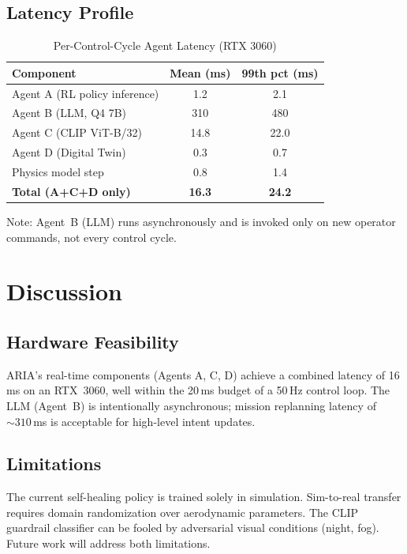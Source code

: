 \documentclass[10pt,twocolumn]{article}
\begin{document}
\subsection{Latency Profile}

\begin{table}[h]
\centering
\caption{Per-Control-Cycle Agent Latency (RTX 3060)}
\label{tab:latency}
\begin{tabular}{lcc}
\toprule
Component & Mean (ms) & 99th pct (ms) \\
\midrule
Agent A (RL policy inference) & 1.2  & 2.1 \\
Agent B (LLM, Q4 7B)          & 310  & 480 \\
Agent C (CLIP ViT-B/32)       & 14.8 & 22.0 \\
Agent D (Digital Twin)        & 0.3  & 0.7 \\
Physics model step            & 0.8  & 1.4 \\
\midrule
\textbf{Total (A+C+D only)}   & \textbf{16.3} & \textbf{24.2} \\
\bottomrule
\end{tabular}
\end{table}

Note: Agent~B (LLM) runs asynchronously and is invoked only on new
operator commands, not every control cycle.

\section{Discussion}
\label{sec:discussion}

\subsection{Hardware Feasibility}
ARIA's real-time components (Agents A, C, D) achieve a combined
latency of 16\,ms on an RTX~3060, well within the 20\,ms budget of
a 50\,Hz control loop. The LLM (Agent~B) is intentionally
asynchronous; mission replanning latency of ${\sim}310$\,ms is
acceptable for high-level intent updates.

\subsection{Limitations}
The current self-healing policy is trained solely in simulation.
Sim-to-real transfer requires domain randomization over aerodynamic
parameters. The CLIP guardrail classifier can be fooled by
adversarial visual conditions (night, fog). Future work will
address both limitations.
\end{document}
